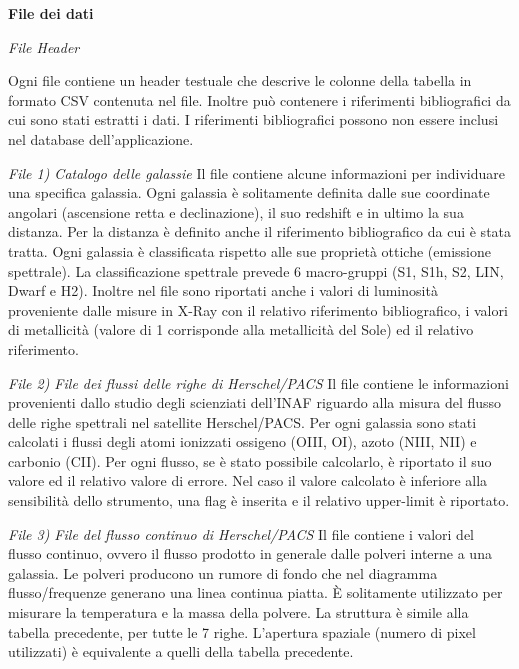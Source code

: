 \documentclass[12pt,a4paper,onecolumn]{article}
\begin{document}
\begin{flushleft}
		\textbf{File dei dati}\newline
		
		\textit{File Header}\newline
		
		Ogni file contiene un header testuale che descrive le colonne della tabella in formato CSV contenuta nel file. Inoltre può contenere i riferimenti bibliografici da cui sono stati estratti i dati. I riferimenti bibliografici possono non essere inclusi nel database dell’applicazione.
		\newline
		
		\textit{File 1) Catalogo delle galassie}\newline
		Il file contiene alcune informazioni per individuare una specifica galassia.
		Ogni galassia è solitamente definita dalle sue coordinate angolari (ascensione retta e declinazione), il suo redshift e in ultimo la sua distanza. Per la distanza è definito anche il riferimento bibliografico da cui è stata tratta.\newline
		Ogni galassia è classificata rispetto alle sue proprietà ottiche (emissione spettrale). La classificazione spettrale prevede 6 macro-gruppi (S1, S1h, S2, LIN, Dwarf e H2). Inoltre nel file sono riportati anche i valori di luminosità proveniente dalle misure in X-Ray con il relativo riferimento bibliografico, i valori di metallicità (valore di 1 corrisponde alla metallicità del Sole) ed il relativo riferimento.\newline
		
		\textit{File 2) File dei flussi delle righe di Herschel/PACS}\newline
		Il file contiene le informazioni provenienti dallo studio degli scienziati dell’INAF riguardo alla misura del flusso delle righe spettrali nel satellite Herschel/PACS. Per ogni galassia sono stati calcolati i flussi degli atomi ionizzati ossigeno (OIII, OI), azoto (NIII, NII) e carbonio (CII). Per ogni flusso, se è stato possibile calcolarlo, è riportato il suo valore ed il relativo valore di errore.\newline
		Nel caso il valore calcolato è inferiore alla sensibilità dello strumento, una flag è inserita e il relativo upper-limit è riportato.\newline
		
		\textit{File 3) File del flusso continuo di Herschel/PACS}\newline
		Il file contiene i valori del flusso continuo, ovvero il flusso prodotto in generale dalle polveri interne a una galassia. Le polveri producono un rumore di fondo che nel diagramma flusso/frequenze generano una linea continua piatta. È solitamente utilizzato per misurare la temperatura e la massa della polvere. La struttura è simile alla tabella precedente, per tutte le 7 righe. L’apertura spaziale (numero di pixel utilizzati) è equivalente a quelli della tabella precedente.\newline
		

\end{flushleft}
\end{document}
